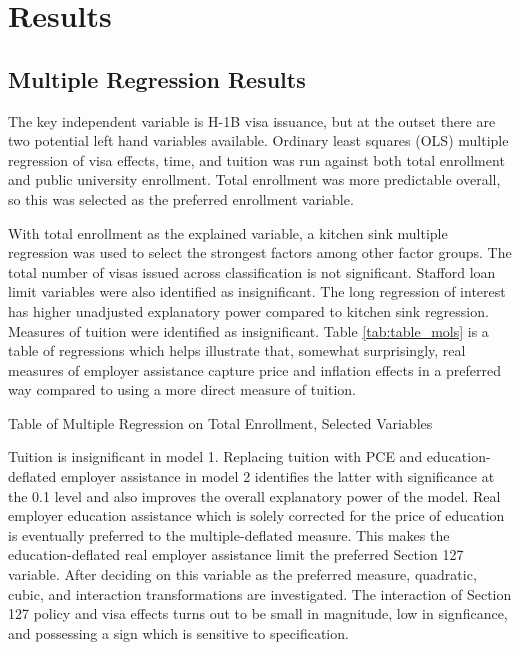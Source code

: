 \documentclass[review]{elsarticle}
\begin{document}
    \section{Results}

    \subsection{Multiple Regression Results}
    The key independent variable is H-1B visa issuance, but at the outset there are two potential left hand variables available.
    Ordinary least squares (OLS) multiple regression of visa effects, time, and tuition was run against both total enrollment and public university enrollment.
    Total enrollment was more predictable overall, so this was selected as the preferred enrollment variable.

    With total enrollment as the explained variable,
    a kitchen sink multiple regression was used to select the strongest factors among other factor groups.
    The total number of visas issued across classification is not significant.
    Stafford loan limit variables were also identified as insignificant.
    The long regression of interest has higher unadjusted explanatory power compared to kitchen sink regression.
    Measures of tuition were identified as insignificant.
    Table \ref{tab:table_mols} is a table of regressions which helps illustrate that, somewhat surprisingly,
    real measures of employer assistance capture price and inflation effects in a preferred way
    compared to using a more direct measure of tuition.

    \begin{table}
        \caption{Table of Multiple Regression on Total Enrollment, Selected Variables}
        \resizebox{\columnwidth}{!}{
            
        }
        \label{tab:table_mols}
        \end{table}

    Tuition is insignificant in model 1.
    Replacing tuition with PCE and education-deflated employer assistance in model 2 identifies the latter
    with significance at the 0.1 level and also improves the overall explanatory power of the model.
    Real employer education assistance which is solely corrected for the price of education
    is eventually preferred to the multiple-deflated measure.
    This makes the education-deflated real employer assistance limit the preferred Section 127 variable.
    After deciding on this variable as the preferred measure,
    quadratic, cubic, and interaction transformations are investigated.
    The interaction of Section 127 policy and visa effects turns out to be small in magnitude,
    low in signficance,
    and possessing a sign which is sensitive to specification.
\end{document}
